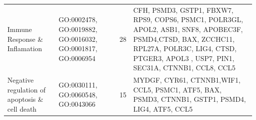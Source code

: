 \documentclass[9pt,twocolumn,twoside]{gsajnl}
\begin{document}
\begin{table}[htbp]
\begin{tableminipage}{\textwidth}
\begin{tabularx}{\textwidth}{m{3cm}m{3.5cm}m{1.2cm}m{9.2cm}}
Immune Response \& Inflamation & GO:0002478, GO:0019882, GO:0016032, GO:0001817, GO:0006954  & 28 & CFH, PSMD3, GSTP1, FBXW7, RPS9,  COPS6, PSMC1, POLR3GL,  APOL2, ASB1, SNF8, APOBEC3F, PSMD4,CTSD, BAX, ZCCHC11, RPL27A,  POLR3C, LIG4,  CTSD, PTGER3, APOL3  , USP7, PIN1, SEC31A, CTNNB1, CCL8, CCL5\\

Negative regulation of apoptosis \& cell death & GO:0030111, GO:0060548, GO:0043066  & 15 & MYDGF, CYR61,  CTNNB1,WIF1, CCL5, PSMC1,  ATF5, BAX, PSMD3, CTNNB1, GSTP1, PSMD4, LIG4, ATF5, CCL5\\

\hline
\end{tabularx}
  \label{tab:over}
\end{tableminipage}
\end{table}
\end{document}
